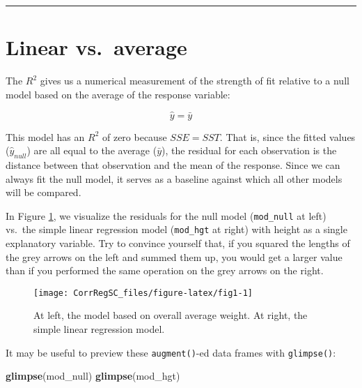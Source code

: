 \documentclass[
]{book}
\newenvironment{Shaded}{\begin{snugshade}}{\end{snugshade}}
\newcommand{\KeywordTok}[1]{\textcolor[rgb]{0.13,0.29,0.53}{\textbf{#1}}}
\newcommand{\NormalTok}[1]{#1}
\begin{document}
\begin{center}\rule{0.5\linewidth}{0.5pt}\end{center}

\hypertarget{linear-vs.-average}{%
\section{Linear vs.~average}\label{linear-vs.-average}}

The \(R^2\) gives us a numerical measurement of the strength of fit relative to a null model based on the average of the response variable:

\begin{equation}
\hat{y}=\bar{y}
\end{equation}

This model has an \(R^2\) of zero because \(SSE = SST\). That is, since the fitted values (\(\hat{y}_{null}\)) are all equal to the average (\(\bar{y}\)), the residual for each observation is the distance between that observation and the mean of the response. Since we can always fit the null model, it serves as a baseline against which all other models will be compared.

In Figure \ref{fig:fig1}, we visualize the residuals for the null model (\texttt{mod\_null} at left) vs.~the simple linear regression model (\texttt{mod\_hgt} at right) with height as a single explanatory variable. Try to convince yourself that, if you squared the lengths of the grey arrows on the left and summed them up, you would get a larger value than if you performed the same operation on the grey arrows on the right.

\begin{figure}

{\centering \texttt{[image: CorrRegSC\_files/figure-latex/fig1-1]} 

}

\caption{At left, the model based on overall average weight. At right, the simple linear regression model.}\label{fig:fig1}
\end{figure}

It may be useful to preview these \texttt{augment()}-ed data frames with \texttt{glimpse()}:

\begin{Shaded}
\begin{Highlighting}[]
\KeywordTok{glimpse}\NormalTok{(mod_null)}
\KeywordTok{glimpse}\NormalTok{(mod_hgt)}
\end{Highlighting}
\end{Shaded}
\end{document}
